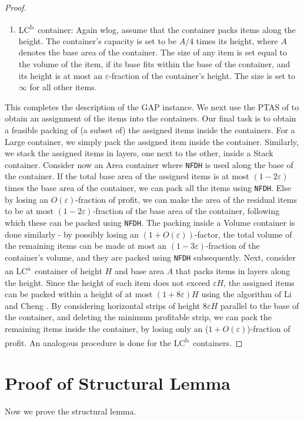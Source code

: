 \documentclass[10pt,a4paper]{amsart}
\renewcommand{\epsilon}{\varepsilon} %
\newcommand{\boxes}{containers\xspace}
\newcommand{\NFDH}{\texttt{NFDH}\xspace}
\theoremstyle{definition}
\newcommand{\lca}{LC\textsuperscript{a}}
\newcommand{\lcb}{LC\textsuperscript{b}}
\begin{document}
\begin{proof}
\begin{enumerate}
        \item \lcb\ container: Again wlog, assume that the container packs items along the height. The container's capacity is set to be $A/4$ times its height, where $A$ denotes the base area of the container. The size of any item is set equal to the volume of the item, if its base fits within the base of the container, and its height is at most an $\epsilon$-fraction of the container's height. The size is set to $\infty$ for all other items.
    \end{enumerate}

    This completes the description of the GAP instance. We next use the PTAS of \cite{2dks-Lpacking} to obtain an assignment of the items into the \boxes. Our final task is to obtain a feasible packing of (a subset of) the assigned items inside the \boxes. For a Large container, we simply pack the assigned item inside the container. Similarly, we stack the assigned items in layers, one next to the other, inside a Stack container. Consider now an Area container where \NFDH is used along the base of the container. If the total base area of the assigned items is at most $(1-2\epsilon)$ times the base area of the container, we can pack all the items using \NFDH. Else by losing an $O(\epsilon)$-fraction of profit, we can make the area of the residual items to be at most $(1-2\epsilon)$-fraction of the base area of the container, following which these can be packed using \NFDH. The packing inside a Volume container is done similarly - by possibly losing an $(1+O(\epsilon))$-factor, the total volume of the remaining items can be made at most an $(1-3\epsilon)$-fraction of the container's volume, and they are packed using \NFDH subsequently. Next, consider an \lca\ container of height $H$ and base area $A$ that packs items in layers along the height. Since the height of each item does not exceed $\epsilon H$, the assigned items can be packed within a height of at most $(1+8\epsilon)H$ using the algorithm of Li and Cheng \cite{li1990three}. By considering horizontal strips of height $8\epsilon H$ parallel to the base of the container, and deleting the minimum profitable strip, we can pack the remaining items inside the container, by losing only an ($1+O(\epsilon)$)-fraction of profit. An analogous procedure is done for the \lcb\ \boxes.
\end{proof}
\fi

\section{Proof of Structural Lemma}
\label{sec:structurallemma}
Now we prove the structural lemma. 
\end{document}
